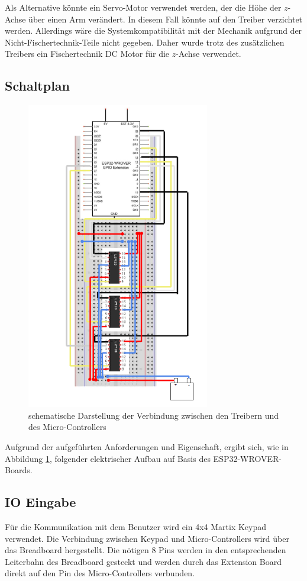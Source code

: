 \documentclass[conference,compsoc,final,a4paper]{IEEEtran}
\begin{document}
Als Alternative könnte ein Servo-Motor verwendet werden, der die Höhe der $z$-Achse über einen Arm verändert. 
In diesem Fall könnte auf den Treiber verzichtet werden. Allerdings wäre die Systemkompatibilität mit der Mechanik aufgrund der Nicht-Fischertechnik-Teile nicht gegeben. 
Daher wurde trotz des zusätzlichen Treibers ein Fischertechnik DC Motor für die $z$-Achse verwendet.

\subsection{Schaltplan}
\begin{figure}[h]
\includegraphics[width=8cm]{../images/schaltplan.png}
\caption{schematische Darstellung der Verbindung zwischen den Treibern und des Micro-Controllers}\label{Elektrik:Schaltplan}
\end{figure}

Aufgrund der aufgeführten Anforderungen und Eigenschaft, ergibt sich, wie in Abbildung \ref{Elektrik:Schaltplan}, folgender elektrischer Aufbau auf Basis des ESP32-WROVER-Boards.
\subsection{IO Eingabe}

Für die Kommunikation mit dem Benutzer wird ein 4x4 Martix Keypad verwendet. Die Verbindung zwischen Keypad und Micro-Controllers wird über das Breadboard hergestellt. 
Die nötigen 8 Pins werden in den entsprechenden Leiterbahn des Breadboard gesteckt und werden durch das Extension Board  direkt auf den Pin des Micro-Controllers verbunden.
\end{document}
